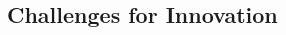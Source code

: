 \documentclass[10pt, plain]{../../metanetpaper}
\begin{document}
\begin{multicols}{2}

%
%
%



\subsection{Challenges for Innovation}
\label{sec:powerf-mech-showcasing-and-innovation}


\end{multicols}
\end{document}
